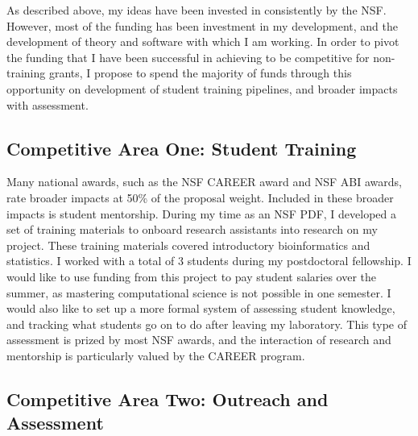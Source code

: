 \documentclass[]{article}
\begin{document}
As described above, my ideas have been invested in consistently by the NSF.
However, most of the funding has been investment in my development, and the development of theory and software with which I am working.
In order to pivot the funding that I have been successful in achieving to be competitive for non-training grants, I propose to spend the majority of funds through this opportunity on development of student training pipelines, and broader impacts with assessment. \par
\subsection{Competitive Area One: Student Training}

Many national awards, such as the NSF CAREER award and NSF ABI awards, rate broader impacts at 50\% of the proposal weight.
Included in these broader impacts is student mentorship. 
During my time as an NSF PDF, I developed a set of training materials to onboard research assistants into research on my project.
These training materials covered introductory bioinformatics and statistics.
I worked with a total of 3 students during my postdoctoral fellowship.
I would like to use funding from this project to pay student salaries over the summer, as mastering computational science is not possible in one semester.
I would also like to set up a more formal system of assessing student knowledge, and tracking what students go on to do after leaving my laboratory. 
This type of assessment is prized by most NSF awards, and the interaction of research and mentorship is particularly valued by the CAREER program. \par

\subsection{Competitive Area Two: Outreach and Assessment}
\end{document}
